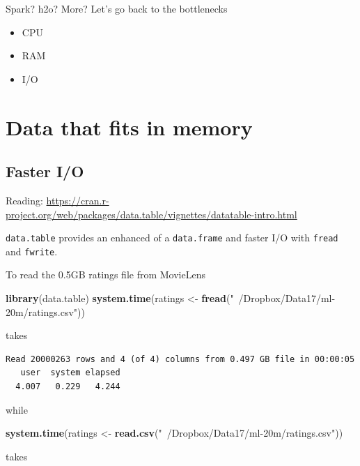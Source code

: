 \documentclass[]{book}
\newenvironment{Shaded}{\begin{snugshade}}{\end{snugshade}}
\newcommand{\KeywordTok}[1]{\textcolor[rgb]{0.13,0.29,0.53}{\textbf{#1}}}
\newcommand{\StringTok}[1]{\textcolor[rgb]{0.31,0.60,0.02}{#1}}
\newcommand{\NormalTok}[1]{#1}
\providecommand{\tightlist}{%
  \setlength{\itemsep}{0pt}\setlength{\parskip}{0pt}}
\theoremstyle{definition}
\theoremstyle{definition}
\theoremstyle{definition}
\theoremstyle{remark}
\begin{document}
Spark? h2o? More? Let's go back to the bottlenecks

\begin{itemize}
\tightlist
\item
  CPU
\item
  RAM
\item
  I/O
\end{itemize}

\section{Data that fits in memory}\label{data-that-fits-in-memory}

\subsection{Faster I/O}\label{faster-io}

Reading:
\url{https://cran.r-project.org/web/packages/data.table/vignettes/datatable-intro.html}

\texttt{data.table} provides an enhanced of a \texttt{data.frame} and
faster I/O with \texttt{fread} and \texttt{fwrite}.

To read the 0.5GB ratings file from MovieLens

\begin{Shaded}
\begin{Highlighting}[]
\KeywordTok{library}\NormalTok{(data.table)}
\KeywordTok{system.time}\NormalTok{(ratings <-}\StringTok{ }\KeywordTok{fread}\NormalTok{(}\StringTok{"~/Dropbox/Data17/ml-20m/ratings.csv"}\NormalTok{))}
\end{Highlighting}
\end{Shaded}

takes

\begin{verbatim}
Read 20000263 rows and 4 (of 4) columns from 0.497 GB file in 00:00:05
   user  system elapsed 
  4.007   0.229   4.244
\end{verbatim}

while

\begin{Shaded}
\begin{Highlighting}[]
\KeywordTok{system.time}\NormalTok{(ratings <-}\StringTok{ }\KeywordTok{read.csv}\NormalTok{(}\StringTok{"~/Dropbox/Data17/ml-20m/ratings.csv"}\NormalTok{))}
\end{Highlighting}
\end{Shaded}

takes
\end{document}
